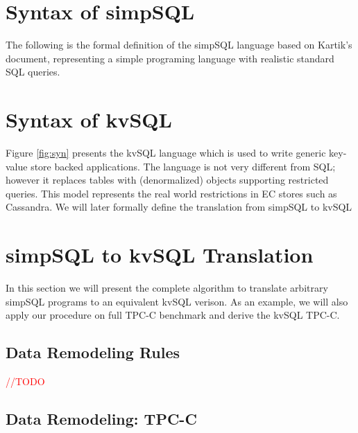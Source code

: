 \documentclass[12pt,letter]{article}
\begin{document}
\maketitle

\section{Syntax of simpSQL}
The following is the formal definition of the simpSQL language based on Kartik's document,
representing a simple programing language with realistic standard SQL queries.



\section{Syntax of kvSQL}
Figure \ref{fig:syn} presents the kvSQL language which is used to write
generic key-value store backed applications. The language is not very
different from SQL; however it replaces tables with (denormalized)
objects supporting restricted queries. This model represents the real world restrictions in EC stores such as Cassandra. We will later formally define the
translation from simpSQL to kvSQL



\section{simpSQL to kvSQL Translation}
In this section we will present the complete algorithm to translate arbitrary simpSQL 
programs to an equivalent kvSQL verison. 
As an example, we will also apply our procedure on full TPC-C benchmark and
derive the kvSQL TPC-C.

\subsection{Data Remodeling Rules}
\textcolor{red}{//TODO}
\subsection{Data Remodeling: TPC-C}

\end{document}
